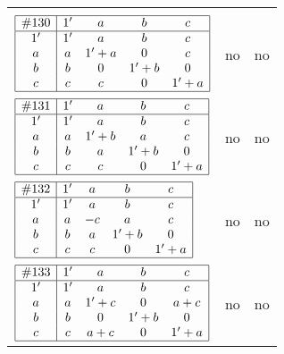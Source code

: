 \documentclass[12pt]{article}
\newcommand{\join}{\mathbin{+}}%
\newcommand{\id}{{1'}}%
\begin{document}
\begin{center}
\begin{longtable}{l|c|c}
{\begin{tikzpicture}[<->,shorten <=1pt,shorten >=1pt,label distance=0mm, font=\small]
\end{tikzpicture}
}      \\[15mm]

$
\begin{array}{|c|cccc|} \hline
\#130 & \id & a & b & c \\ \hline
\id & \id & a & b & c \\
a & a & \id \join a & 0 & c \\
b & b & 0 & \id \join b & 0 \\
c & c & c & 0 & \id \join a \\ \hline
\end{array}
$
 & no  
 & no     \\[15mm]

$
\begin{array}{|c|cccc|} \hline
\#131 & \id & a & b & c \\ \hline
\id & \id & a & b & c \\
a & a & \id \join b & a & c \\
b & b & a & \id \join b & 0 \\
c & c & c & 0 & \id \join a \\ \hline
\end{array}
$
 & no  
 & no      \\[15mm]

$
\begin{array}{|c|cccc|} \hline
\#132 & \id & a & b & c \\ \hline
\id & \id & a & b & c \\
a & a & -c & a & c \\
b & b & a & \id \join b & 0 \\
c & c & c & 0 & \id \join a \\ \hline
\end{array}
$
 & no  
 & no      \\[15mm]

$
\begin{array}{|c|cccc|} \hline
\#133 & \id & a & b & c \\ \hline
\id & \id & a & b & c \\
a & a & \id \join c & 0 & a \join c \\
b & b & 0 & \id \join b & 0 \\
c & c & a \join c & 0 & \id \join a \\ \hline
\end{array}
$
 & no  
 & no      \\[15mm]


\end{longtable}
\end{center}
\end{document}
